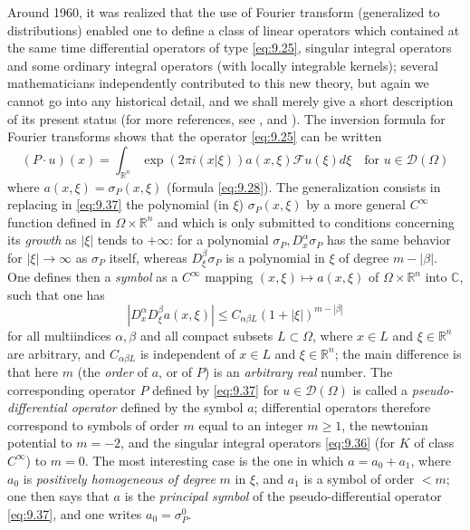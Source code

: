 \documentclass[12pt,a4paper,leqno,twoside]{extbook}
\newcommand{\C}{\mathbb{C}}
\newcommand{\R}{\mathbb{R}}
\begin{document}
Around 1960, it was realized that the use of Fourier transform (generalized to distributions) enabled one to define a class of linear operators which contained at the same time differential operators of type \eqref{eq:9.25}, singular integral operators and some ordinary integral operators (with locally integrable kernels); several mathematicians independently contributed to this new theory, but again we cannot go into any historical detail, and we shall merely give a short description of its present status (for more references, see \cite{D}, \cite{119} and \cite{068}). The inversion formula for Fourier transforms shows that the operator \eqref{eq:9.25} can be written
\begin{equation}
    \label{eq:9.37}
    (P \cdot u)(x) = \int_{\R^n} \exp(2\pi i(x|\xi))a(x,\xi)\mathcal{F}u(\xi)d\xi
    \quad
    \text{for } u \in \mathcal{D}(\Omega)
\end{equation}
where \(a(x,\xi) = \sigma_P(x,\xi)\) (formula \eqref{eq:9.28}). The generalization consists in replacing in \eqref{eq:9.37} the polynomial (in \(\xi\)) \(\sigma_P(x,\xi)\) by a more general \(C^\infty\) function defined in \(\Omega \times \R^n\) and which is only submitted to conditions concerning its \emph{growth} as \(|\xi|\) tends to \(+\infty\): for a polynomial \(\sigma_P, D^\alpha_x \sigma_P\) has the same behavior for \(|\xi| \to \infty\) as \(\sigma_P\) itself, whereas \(D^\beta_\xi \sigma_P\) is a polynomial in \(\xi\) of degree \(m - |\beta|\). One defines then a \emph{symbol} as a \(C^\infty\) mapping \((x,\xi) \mapsto a(x, \xi)\) of \(\Omega \times \R^n\) into \(\C\), such that one has
\begin{equation}
    \label{eq:9.38}
    |D^\alpha_x D^\beta_\xi a(x, \xi)| \leq C_{\alpha \beta L} (1 + |\xi|)^{m-|\beta|}
\end{equation}
for all multiindices \(\alpha, \beta\) and all compact subsets \(L \subset \Omega\), where \(x \in L\) and \(\xi \in \R^n\) are arbitrary, and \(C_{\alpha \beta L}\) is independent of \(x \in L\) and \(\xi \in \R^n\); the main difference is that here \(m\) (the \emph{order} of \(a\), or of \(P\)) is an \emph{arbitrary real} number. The corresponding operator \(P\) defined by \eqref{eq:9.37} for \(u \in \mathcal{D}(\Omega)\) is called a \emph{pseudo-differential operator} defined by the symbol \(a\); differential operators therefore correspond to symbols of order \(m\) equal to an integer \(m \geq 1\), the newtonian potential to \(m = -2\), and the singular integral operators \eqref{eq:9.36} (for \(K\) of class \(C^\infty\)) to \(m = 0\). The most interesting case is the one in which \(a = a_0 + a_1\), where \(a_0\) is \emph{positively homogeneous of degree} \(m\) in \(\xi\), and \(a_1\) is a symbol of order \(< m\); one then says that \(a\) is the \emph{principal symbol} of the pseudo-differential operator \eqref{eq:9.37}, and one writes \(a_0 = \sigma^0_P\).
\end{document}
